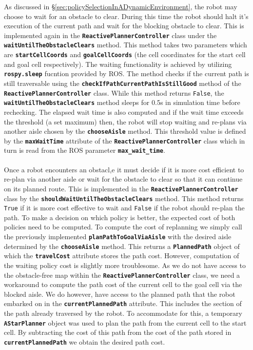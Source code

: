 \documentclass[a4paper,12pt]{article}
\begin{document}
		As discussed in \S \ref{sec:policySelectionInADynamicEnvironment}, the robot may choose to wait for an obstacle to clear. During this time the robot should halt it's execution of the current path and wait for the blocking obstacle to clear. This is implemented again in the \textbf{\texttt{ReactivePlannerController}} class under the \textbf{\texttt{waitUntilTheObstacleClears}} method. This method takes two parameters which are \textbf{\texttt{startCellCoords}} and \textbf{\texttt{goalCellCoords}} (the cell coordinates for the start cell and goal cell respectively). The waiting functionality is achieved by utilizing \textbf{\texttt{rospy.sleep}} fucntion provided by ROS. The method checks if the current path is still traversable using the \textbf{\texttt{checkIfPathCurrentPathIsStillGood}} method of the \textbf{\texttt{ReactivePlannerController}} class. While this method returns \texttt{False}, the \textbf{\texttt{waitUntilTheObstacleClears}} method sleeps for 0.5s in simulation time before rechecking. The elapsed wait time is also computed and if the wait time exceeds the threshold (a set maximum) then, the robot will stop waiting and re-plans via another aisle chosen by the \textbf{\texttt{chooseAisle}} method. This threshold value is defined by the \textbf{\texttt{maxWaitTime}} attribute of the \textbf{\texttt{ReactivePlannerController}} class which in turn is read from the ROS parameter \textbf{\texttt{max\_wait\_time}}.
		\\
		\\
		Once a robot encounters an obstacl,e it must decide if it is more cost efficient to re-plan via another aisle or wait for the obstacle to clear so that it can continue on its planned route. This is implemented in the \textbf{\texttt{ReactivePlannerController}} class by the \textbf{\texttt{shouldWaitUntilTheObstacleClears}} method. This method returns \texttt{True} if it is more cost effective to wait and \texttt{False} if the robot should re-plan the path. To make a decision on which policy is better, the expected cost of both policies need to be computed. To compute the cost of replanning we simply call the previously implemented \textbf{\texttt{planPathToGoalViaAisle}} with the desired aisle determined by the \textbf{\texttt{chooseAisle}} method. This returns a \textbf{\texttt{PlannedPath}} object of which the \textbf{\texttt{travelCost}} attribute stores the path cost. However, computation of the waiting policy cost is slightly more troublesome. As we do not have access to the obstacle-free map within the \textbf{\texttt{ReactivePlannerController}} class, we need a workaround to compute the path cost of the current cell to the goal cell via the blocked aisle. We do however, have access to the planned path that the robot embarked on in the \textbf{\texttt{currentPlannedPath}} attribute. This includes the section of the path already traversed by the robot. To accommodate for this, a temporary \textbf{\texttt{AStarPlanner}} object was used to plan the path from the current cell to the start cell. By subtracting the cost of this path from the cost of the path stored in \textbf{\texttt{currentPlannedPath}} we obtain the desired path cost.
\end{document}
